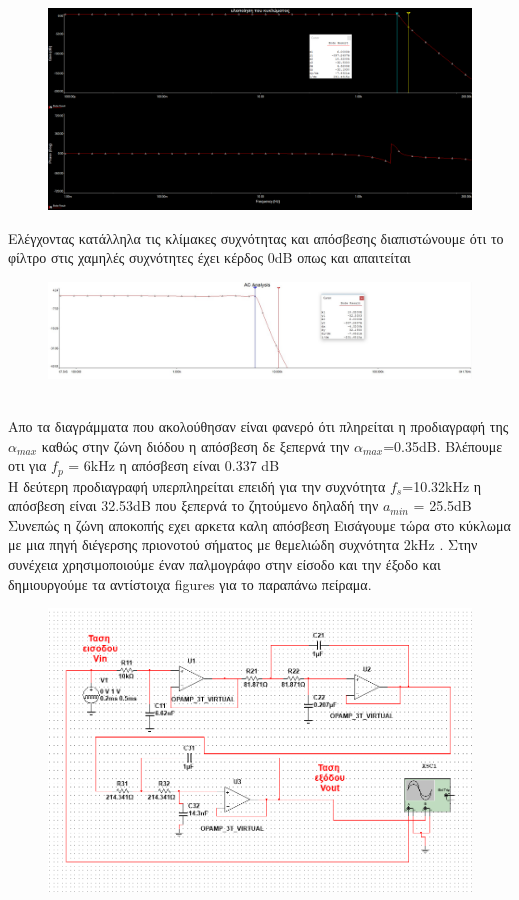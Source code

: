 \documentclass{article}
\begin{document}
{\begin{figure}[h!]
\centering
 	\advance\leftskip-4.3cm
  \includegraphics[width=210mm,scale=2]{bode_ploter2.png}
\end{figure} 
\clearpage
Ελέγχοντας κατάλληλα τις κλίμακες συχνότητας και απόσβεσης διαπιστώνουμε ότι το φίλτρο στις χαμηλές συχνότητες έχει κέρδος 0dB οπως και απαιτείται \\
\begin{figure}[h!]
\centering
 	\advance\leftskip-4.4cm
  \includegraphics[width=215mm,scale=2]{ac1.jpg}
\end{figure} \\
Απο τα διαγράμματα που ακολούθησαν είναι φανερό ότι πληρείται η προδιαγραφή της  $α_{max}$ καθώς στην ζώνη διόδου η απόσβεση δε ξεπερνά την $α_{max}$=0.35dB. Βλέπουμε οτι για $f_p$ = 6kHz η απόσβεση είναι 0.337 dB \\ Η δεύτερη προδιαγραφή υπερπληρείται επειδή για την συχνότητα $f_s$=10.32kHz η απόσβεση είναι 32.53dB  που ξεπερνά το ζητούμενο δηλαδή την $a_{min}$ = 25.5dB \\
Συνεπώς η ζώνη αποκοπής εχει αρκετα καλη απόσβεση  
\clearpage
Εισάγουμε τώρα στο κύκλωμα με μια πηγή διέγερσης πριονοτού σήματος με θεμελιώδη συχνότητα 2kHz . Στην συνέχεια χρησιμοποιούμε έναν παλμογράφο στην είσοδο και την έξοδο και δημιουργούμε τα αντίστοιχα figures για το παραπάνω πείραμα.
\begin{figure}[h!]
\centering
 	\advance\leftskip-4cm
  \includegraphics[width=200mm,scale=2]{circ.png}

\end{figure}}
\end{document}
